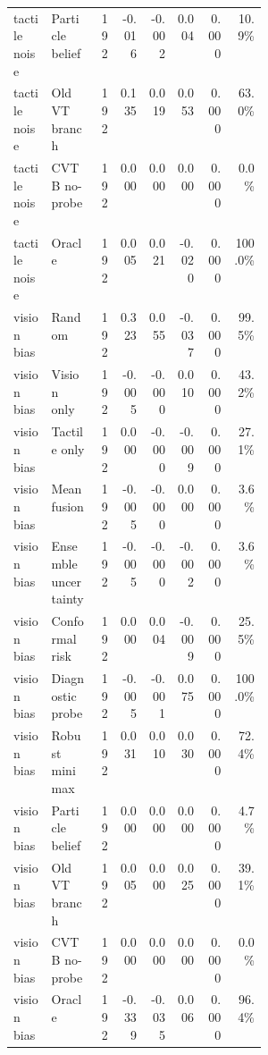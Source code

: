{\begin{longtable}{@{}p{0.15\linewidth}p{0.18\linewidth}rrrrrr@{}}
tactile noise & Particle belief & 192 & -0.016 & -0.002 & 0.004 & 0.000 & 10.9\% \\
tactile noise & Old VT branch & 192 & 0.135 & 0.019 & 0.053 & 0.000 & 63.0\% \\
tactile noise & CVTB no-probe & 192 & 0.000 & 0.000 & 0.000 & 0.000 & 0.0\% \\
tactile noise & Oracle & 192 & 0.005 & 0.021 & -0.020 & 0.000 & 100.0\% \\
vision bias & Random & 192 & 0.323 & 0.055 & -0.037 & 0.000 & 99.5\% \\
vision bias & Vision only & 192 & -0.005 & -0.000 & 0.010 & 0.000 & 43.2\% \\
vision bias & Tactile only & 192 & 0.000 & -0.000 & -0.009 & 0.000 & 27.1\% \\
vision bias & Mean fusion & 192 & -0.005 & -0.000 & 0.000 & 0.000 & 3.6\% \\
vision bias & Ensemble uncertainty & 192 & -0.005 & -0.000 & -0.002 & 0.000 & 3.6\% \\
vision bias & Conformal risk & 192 & 0.000 & 0.004 & -0.009 & 0.000 & 25.5\% \\
vision bias & Diagnostic probe & 192 & -0.005 & -0.001 & 0.075 & 0.000 & 100.0\% \\
vision bias & Robust minimax & 192 & 0.031 & 0.010 & 0.030 & 0.000 & 72.4\% \\
vision bias & Particle belief & 192 & 0.000 & 0.000 & 0.000 & 0.000 & 4.7\% \\
vision bias & Old VT branch & 192 & 0.005 & 0.000 & 0.025 & 0.000 & 39.1\% \\
vision bias & CVTB no-probe & 192 & 0.000 & 0.000 & 0.000 & 0.000 & 0.0\% \\
vision bias & Oracle & 192 & -0.339 & -0.035 & 0.006 & 0.000 & 96.4\% \\
\bottomrule
\end{longtable}
}
